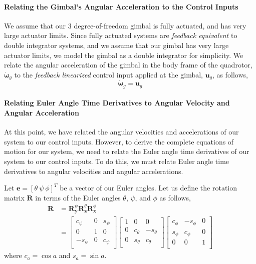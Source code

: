 \paragraph{Relating the Gimbal's Angular Acceleration to the Control Inputs}
We assume that our 3 degree-of-freedom gimbal is fully actuated, and has very large actuator limits. Since fully actuated systems are \emph{feedback equivalent} \cite{tedrake:2016} to double integrator systems, and we assume that our gimbal has very large actuator limits, we model the gimbal as a double integrator for simplicity. We relate the angular acceleration of the gimbal in the body frame of the quadrotor, $\dot{\mathbf{\omega}}_g$ to the \emph{feedback linearized} \cite{tedrake:2016} control input applied at the gimbal, $\mathbf{u}_g$, as follows,
%
\begin{equation}
\dot{\mathbf{\omega}}_g = \mathbf{u}_g
\label{eqn:ch2:u_g_short}
\end{equation}
%

\paragraph{Relating Euler Angle Time Derivatives to Angular Velocity and Angular Acceleration}

At this point, we have related the angular velocities and accelerations of our system to our control inputs.
However, to derive the complete equations of motion for our system, we need to relate the Euler angle time derivatives of our system to our control inputs.
To do this, we must relate Euler angle time derivatives to angular velocities and angular accelerations.

Let $\mathbf{e} = [ \theta ~ \psi ~ \phi ]^T$ be a vector of our Euler angles.
Let us define the rotation matrix $\mathbf{R}$ in terms of the Euler angles $\theta$, $\psi$, and $\phi$ as follows,
%
\begin{equation}
\begin{aligned}
%
\mathbf{R} & = \mathbf{R}_{\mathbf{y}}^{\psi} \mathbf{R}_{\mathbf{z}}^{\theta} \mathbf{R}_{\mathbf{x}}^{\phi} \\
& = 
\begin{bmatrix}
c_\psi  & 0 & s_\psi \\
0       & 1 & 0 \\
-s_\psi & 0 & c_\psi \\
\end{bmatrix}
\begin{bmatrix}
1 & 0        & 0 \\
0 & c_\theta & -s_\theta \\
0 & s_\theta & c_\theta \\
\end{bmatrix}
%
\begin{bmatrix}
c_\phi & -s_\phi & 0 \\
s_\phi & c_\phi  & 0 \\
0      & 0       & 1 \\
\end{bmatrix}
%
%
\end{aligned}
\end{equation}
%
where $c_a=\cos a$ and $s_a=\sin a$.

